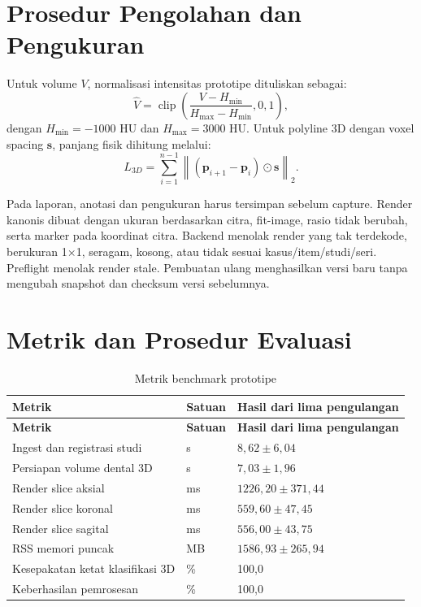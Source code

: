 \documentclass[12pt,a4paper,oneside]{report}
\begin{document}
\section{Prosedur Pengolahan dan Pengukuran}
Untuk volume $V$, normalisasi intensitas prototipe dituliskan sebagai:
\begin{equation}
\hat{V}=\operatorname{clip}\left(\frac{V-H_{\min}}{H_{\max}-H_{\min}},0,1\right),
\end{equation}
dengan $H_{\min}=-1000$ HU dan $H_{\max}=3000$ HU. Untuk polyline 3D dengan voxel spacing $\mathbf{s}$, panjang fisik dihitung melalui:
\begin{equation}
L_{3D}=\sum_{i=1}^{n-1}\left\|(\mathbf{p}_{i+1}-\mathbf{p}_i)\odot\mathbf{s}\right\|_2.
\end{equation}

Pada laporan, anotasi dan pengukuran harus tersimpan sebelum capture. Render kanonis dibuat dengan ukuran berdasarkan citra, fit-image, rasio tidak berubah, serta marker pada koordinat citra. Backend menolak render yang tak terdekode, berukuran 1$\times$1, seragam, kosong, atau tidak sesuai kasus/item/studi/seri. Preflight menolak render stale. Pembuatan ulang menghasilkan versi baru tanpa mengubah snapshot dan checksum versi sebelumnya.

\section{Metrik dan Prosedur Evaluasi}
\begin{longtable}{p{5.7cm}p{2cm}p{4.4cm}}
\caption{Metrik benchmark prototipe}\label{tab:metrik-benchmark}\\
\toprule\textbf{Metrik} & \textbf{Satuan} & \textbf{Hasil dari lima pengulangan}\\\midrule
\endfirsthead
\toprule\textbf{Metrik} & \textbf{Satuan} & \textbf{Hasil dari lima pengulangan}\\\midrule\endhead
Ingest dan registrasi studi & s & $8{,}62\pm6{,}04$\\
Persiapan volume dental 3D & s & $7{,}03\pm1{,}96$\\
Render slice aksial & ms & $1226{,}20\pm371{,}44$\\
Render slice koronal & ms & $559{,}60\pm47{,}45$\\
Render slice sagital & ms & $556{,}00\pm43{,}75$\\
RSS memori puncak & MB & $1586{,}93\pm265{,}94$\\
Kesepakatan ketat klasifikasi 3D & \% & 100,0\\
Keberhasilan pemrosesan & \% & 100,0\\
\bottomrule
\end{longtable}
\end{document}
